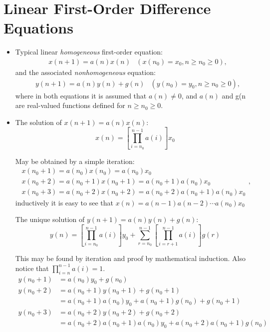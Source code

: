 \section{Linear First-Order Difference Equations}
\begin{itemize}
    \item Typical linear \textit{homogeneous} first-order equation:
        \begin{align*} & x(n+1)=a(n)x(n) & \left(x(n_0)=x_0, n\geq n_0\geq 0\right), \end{align*}
        and the associated \textit{nonhomogeneous} equation:
        \begin{align*} & y(n+1)=a(n)y(n)+g(n) & \left(y(n_0)=y_0, n\geq n_0\geq 0\right), \end{align*}
        where in both equations it is assumed that $a(n)\neq 0$, and $a(n)$ and g(n are real-valued functions defined for $n\geq n_0\geq 0$.
    \item The solution of $x(n+1)=a(n)x(n)$:
        \[x(n)=\left[\prod_{i=n_0}^{n-1} a(i)\right]x_0\]
        \begin{explanation}
            May be obtained by a simple iteration:
            \[
            \begin{array}{l}
                x(n_0+1)=a(n_0)x(n_0)=a(n_0)x_0 \\
                x(n_0+2)=a(n_0+1)x(n_0+1)=a(n_0+1)a(n_0)x_0 \\
                x(n_0+3)=a(n_0+2)x(n_0+2)=a(n_0+2)a(n_0+1)a(n_0)x_0
            \end{array},
        \]
        inductively it is easy to see that $x(n)=a(n-1)a(n-2)\cdots a(n_0)x_0$
        \end{explanation}
        The unique solution of $y(n+1)=a(n)y(n)+g(n)$:
        \[y(n)=\left[\prod_{i=n_0}^{n-1} a(i)\right]y_0+\sum_{r=n_0}^{n-1}\left[\prod_{i=r+1}^{n-1} a(i)\right]g(r)\]
        \begin{explanation}
            This may be found by iteration and proof by mathematical induction. Also notice that $\prod_{i=n}^{n-1} a(i)=1$.
            \begin{align*}
                y(n_0+1) & =a(n_0)y_0+g(n_0) \\
                y(n_0+2) & =a(n_0+1)y(n_0+1)+g(n_0+1) \\
                         & =a(n_0+1)a(n_0)y_0+a(n_0+1)g(n_0)+g(n_0+1) \\
                y(n_0+3) & =a(n_0+2)y(n_0+2)+g(n_0+2) \\
                         & =a(n_0+2)a(n_0+1)a(n_0)y_0+a(n_0+2)a(n_0+1)g(n_0) \\

\end{align*}
\end{explanation}
\end{itemize}
